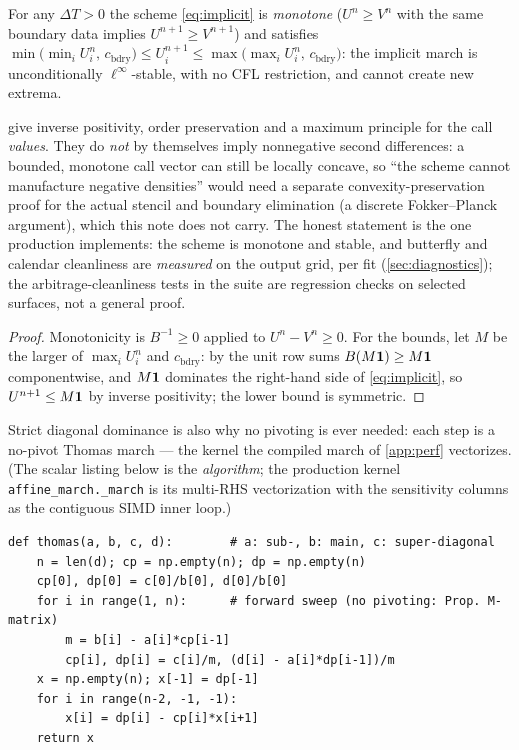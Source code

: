 \documentclass[11pt]{article}
\begin{document}
\begin{corollary}
\label{cor:dmp}
For any $\Delta T>0$ the scheme \eqref{eq:implicit} is \emph{monotone}
($U^n\ge V^n$ with the same boundary data implies $U^{n+1}\ge V^{n+1}$) and
satisfies
$\min\big(\min_iU^n_i,\,c_{\mathrm{bdry}}\big)\le U^{n+1}_i\le
\max\big(\max_iU^n_i,\,c_{\mathrm{bdry}}\big)$: the implicit march is
unconditionally $\ell^\infty$-stable, with no CFL restriction, and cannot
create new extrema.
\end{corollary}

\begin{remark}
\label{rem:mmscope}
 give inverse positivity, order preservation and a
maximum principle for the call \emph{values}. They do \emph{not} by
themselves imply nonnegative second differences: a bounded, monotone call
vector can still be locally concave, so ``the scheme cannot manufacture
negative densities'' would need a separate convexity-preservation proof for
the actual stencil and boundary elimination (a discrete Fokker--Planck
argument), which this note does not carry. The honest statement is the one
production implements: the scheme is monotone and stable, and butterfly and
calendar cleanliness are \emph{measured} on the output grid, per fit
(\cref{sec:diagnostics}); the arbitrage-cleanliness tests in the suite are
regression checks on selected surfaces, not a general proof.
\end{remark}

\begin{proof}
Monotonicity is $B^{-1}\ge0$ applied to $U^n-V^n\ge0$. For the bounds, let
$M$ be the larger of $\max_iU^n_i$ and $c_{\mathrm{bdry}}$: by the unit row
sums $B(M\mathbf{1})\ge M\mathbf{1}$ componentwise, and $M\mathbf{1}$ dominates the right-hand side
of \eqref{eq:implicit}, so $U^{n+1}\le M\mathbf{1}$ by inverse positivity; the lower
bound is symmetric.
\end{proof}

Strict diagonal dominance is also why no pivoting is ever needed: each step is
a no-pivot Thomas march --- the kernel the compiled march of \cref{app:perf}
vectorizes. (The scalar listing below is the \emph{algorithm}; the production
kernel \texttt{affine\_march.\_march} is its multi-RHS vectorization with the
sensitivity columns as the contiguous SIMD inner loop.)

\begin{lstlisting}[caption={The no-pivot tridiagonal (Thomas) solve for one
implicit step \eqref{eq:implicit} --- the scalar algorithm that
\texttt{models/localvol/affine\_march.py} vectorizes; matches a dense solve to
$10^{-10}$.},label={lst:thomas}]
def thomas(a, b, c, d):        # a: sub-, b: main, c: super-diagonal
    n = len(d); cp = np.empty(n); dp = np.empty(n)
    cp[0], dp[0] = c[0]/b[0], d[0]/b[0]
    for i in range(1, n):      # forward sweep (no pivoting: Prop. M-matrix)
        m = b[i] - a[i]*cp[i-1]
        cp[i], dp[i] = c[i]/m, (d[i] - a[i]*dp[i-1])/m
    x = np.empty(n); x[-1] = dp[-1]
    for i in range(n-2, -1, -1):
        x[i] = dp[i] - cp[i]*x[i+1]
    return x
\end{lstlisting}
\end{document}
